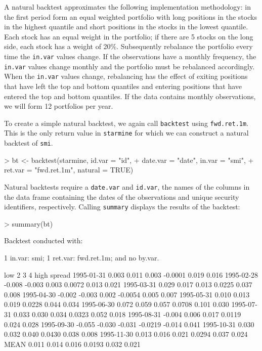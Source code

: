 \documentclass[a4paper]{report}
\begin{document}
\begin{article}
A natural backtest approximates the following implementation
methodology: in the first period form an equal weighted portfolio with
long positions in the stocks in the highest quantile and short
positions in the stocks in the lowest quantile.  Each stock has an
equal weight in the portfolio; if there are 5 stocks on the long side,
each stock has a weight of 20\%.  Subsequently rebalance the portfolio
every time the \texttt{in.var} values change.  If the observations
have a monthly frequency, the \texttt{in.var} values change monthly
and the portfolio must be rebalanced accordingly.  When the
\texttt{in.var} values change, rebalancing has the effect of exiting
positions that have left the top and bottom quantiles and entering
positions that have entered the top and bottom quantiles.  If the data
contains monthly observations, we will form 12 portfolios per year.

To create a simple natural backtest, we again call \texttt{backtest}
using \texttt{fwd.ret.1m}. This is the only return value in
\texttt{starmine} for which we can construct a natural backtest of
\texttt{smi}.

\begin{Schunk}
\begin{Sinput}
> bt <- backtest(starmine, id.var = "id", 
+     date.var = "date", in.var = "smi", 
+     ret.var = "fwd.ret.1m", natural = TRUE)
\end{Sinput}
\end{Schunk}

Natural backtests require a \texttt{date.var} and \texttt{id.var}, the
names of the columns in the data frame containing the dates of the
observations and unique security identifiers, respectively.  Calling
\texttt{summary} displays the results of the backtest:



\begin{Schunk}
\begin{Sinput}
> summary(bt)
\end{Sinput}
\begin{Soutput}
Backtest conducted with:

1 in.var: smi;
1 ret.var: fwd.ret.1m;
and no by.var.

              low      2      3       4   high spread
1995-01-31  0.003  0.011  0.003 -0.0001  0.019  0.016
1995-02-28 -0.008 -0.003  0.003  0.0072  0.013  0.021
1995-03-31  0.029  0.017  0.013  0.0225  0.037  0.008
1995-04-30 -0.002 -0.003  0.002 -0.0054  0.005  0.007
1995-05-31  0.010  0.013  0.019  0.0228  0.044  0.034
1995-06-30  0.072  0.059  0.057  0.0708  0.101  0.030
1995-07-31  0.033  0.030  0.034  0.0323  0.052  0.018
1995-08-31 -0.004  0.006  0.017  0.0119  0.024  0.028
1995-09-30 -0.055 -0.030 -0.031 -0.0219 -0.014  0.041
1995-10-31  0.030  0.032  0.040  0.0430  0.038  0.008
1995-11-30  0.013  0.016  0.021  0.0294  0.037  0.024
MEAN        0.011  0.014  0.016  0.0193  0.032  0.021


\end{Soutput}
\end{Schunk}
\end{article}
\end{document}
